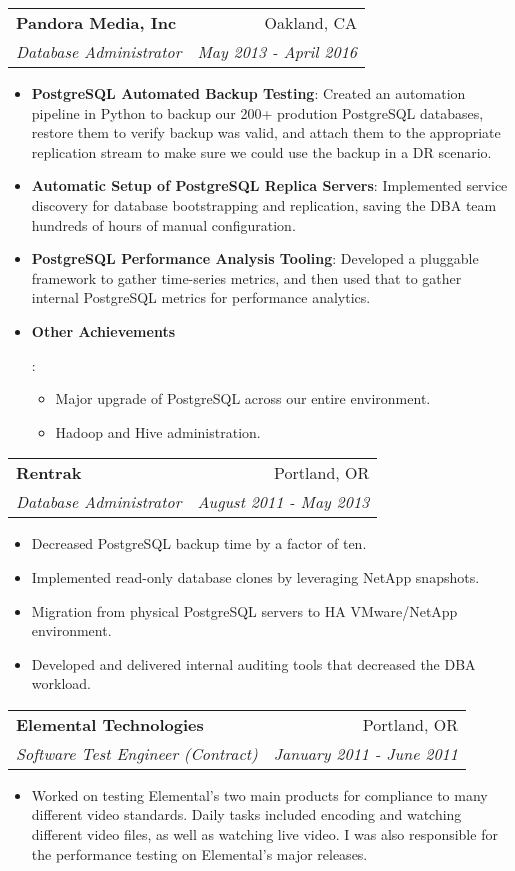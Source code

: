 \documentclass[letterpaper,11pt]{article}
\makeatletter
\newcommand{\resumeItem}[2]{
  \item\small{
    \textbf{#1}{: #2 \vspace{-2pt}}
  }
}
\newcommand{\resumeSubheading}[4]{
  \vspace{-1pt}\item
    \begin{tabular*}{0.97\textwidth}{l@{\extracolsep{\fill}}r}
      \textbf{#1} & #2 \\
      \textit{\small#3} & \textit{\small #4} \\
    \end{tabular*}\vspace{-5pt}
}
\newcommand{\resumeItemListStart}{\begin{itemize}}
\newcommand{\resumeItemListEnd}{\end{itemize}\vspace{-5pt}}
\makeatother
\begin{document}
    \resumeSubheading
      {Pandora Media, Inc}{Oakland, CA}
      {Database Administrator}{May 2013 - April 2016}
      \resumeItemListStart
        \resumeItem{PostgreSQL Automated Backup Testing}
          {Created an automation pipeline in Python to backup our 200+ prodution PostgreSQL databases, restore them to verify backup was valid, and attach them to the appropriate replication stream to make sure we could use the backup in a DR scenario.}
        \resumeItem{Automatic Setup of PostgreSQL Replica Servers}
          {Implemented service discovery for database bootstrapping and replication, saving the DBA team hundreds of hours of manual configuration.}
        \resumeItem{PostgreSQL Performance Analysis Tooling}
          {Developed a pluggable framework to gather time-series metrics, and then used that to gather internal PostgreSQL metrics for performance analytics.}
        \resumeItem{Other Achievements}
          {
            \begin{itemize}[noitemsep]
            \item Major upgrade of PostgreSQL across our entire environment.
            \item Hadoop and Hive administration.
            \end{itemize}
          }
      \resumeItemListEnd

    \resumeSubheading
      {Rentrak}{Portland, OR}
      {Database Administrator}{August 2011 - May 2013}
        \begin{itemize}[noitemsep]
        \item Decreased PostgreSQL backup time by a factor of ten.
        \item Implemented read-only database clones by leveraging NetApp snapshots.
        \item Migration from physical PostgreSQL servers to HA VMware/NetApp environment.
        \item Developed and delivered internal auditing tools that decreased the DBA workload.
        \end{itemize}

    \resumeSubheading
      {Elemental Technologies}{Portland, OR}
      {Software Test Engineer (Contract)}{January 2011 - June 2011}
        \begin{itemize}[noitemsep]
        \item Worked on testing Elemental's two main products for compliance to many different video standards. Daily tasks included encoding and watching different video files, as well as watching live video. I was also responsible for the performance testing on Elemental's major releases.
         \end{itemize}
\end{document}
